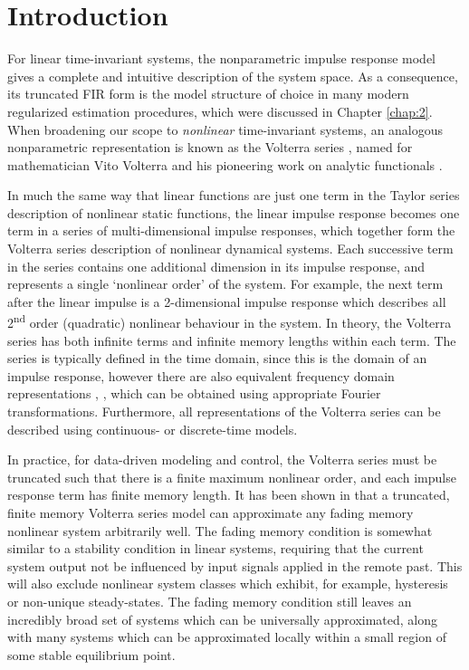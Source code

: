 \section{Introduction}

For linear time-invariant systems, the nonparametric impulse response model gives a complete and intuitive description of the system space. As a consequence, its truncated FIR form is the model structure of choice in many modern regularized estimation procedures, which were discussed in Chapter \ref{chap:2}. When broadening our scope to \emph{nonlinear} time-invariant systems, an analogous nonparametric representation is known as the Volterra series \cite{Schetzen1980}, named for mathematician Vito Volterra and his pioneering work on analytic functionals \cite{Volterra1930}. 

In much the same way that linear functions are just one term in the Taylor series description of nonlinear static functions, the linear impulse response becomes one term in a series of multi-dimensional impulse responses, which together form the Volterra series description of nonlinear dynamical systems. Each successive term in the series contains one additional dimension in its impulse response, and represents a single `nonlinear order' of the system. For example, the next term after the linear impulse is a 2-dimensional impulse response which describes all 2\textsuperscript{nd} order (quadratic) nonlinear behaviour in the system. In theory, the Volterra series has both infinite terms and infinite memory lengths within each term. The series is typically defined in the time domain, since this is the domain of an impulse response, however there are also equivalent frequency domain representations \cite{Schetzen1980}, \cite{Lang2005}, \cite{Lang2007} which can be obtained using appropriate Fourier transformations. Furthermore, all representations of the Volterra series can be described using continuous- or discrete-time models.

In practice, for data-driven modeling and control, the Volterra series must be truncated such that there is a finite maximum nonlinear order, and each impulse response term has finite memory length. It has been shown in \cite{Boyd1985} that a truncated, finite memory Volterra series model can approximate any fading memory nonlinear system arbitrarily well. The fading memory condition is somewhat similar to a stability condition in linear systems, requiring that the current system output not be influenced by input signals applied in the remote past. This will also exclude nonlinear system classes which exhibit, for example, hysteresis or non-unique steady-states. The fading memory condition still leaves an incredibly broad set of systems which can be universally approximated, along with many systems which can be approximated locally within a small region of some stable equilibrium point.

